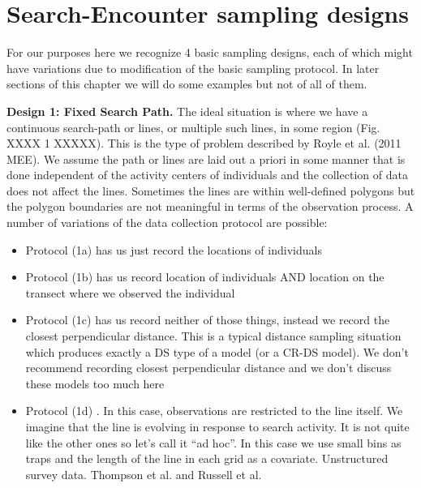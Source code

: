 \section{Search-Encounter sampling designs}

For our purposes here we recognize 4 basic sampling designs, each of
which might have variations due to modification of the basic sampling
protocol. In 
later sections of this chapter we will do some examples but not of all
of them. 

{\flushleft \bf Design 1: Fixed Search Path.}  The ideal situation is
where we have a continuous search-path or lines, or multiple such
lines, in some region (Fig. XXXX 1 XXXXX). This is the type of problem described
by Royle et al. (2011 MEE). We assume the path or lines are laid out a
priori in some manner that is done independent of the activity centers
of individuals and the collection of data does not affect the
lines. Sometimes the lines are within well-defined polygons but the
polygon boundaries are not meaningful in terms of the observation
process.  A number of variations of the data collection protocol are
possible:
\begin{itemize}
 \item[] Protocol (1a) has us just record the locations of individuals
 \item[] Protocol (1b) has us record location of individuals AND
   location on the transect where we observed the individual
 \item[] Protocol (1c) has us record neither of those things, instead
   we record the closest perpendicular distance. This is a typical
   distance sampling situation which produces exactly a DS type of a
   model (or a CR-DS model). We don't recommend recording closest
   perpendicular distance and we don't discuss these models too much
   here
 \item[] Protocol (1d) . In this case, observations are restricted to
   the line itself. We imagine that the line is evolving in response
   to search activity. It is not quite like the other ones so let's
   call it ``ad hoc''. In this case we use small bins as traps and the
   length of the line in each grid as a covariate. Unstructured survey
   data. Thompson et al. and Russell et al.
 \end{itemize}


